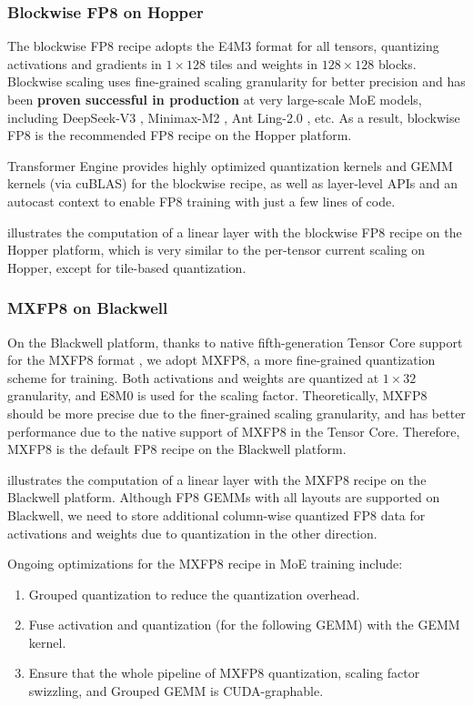 \subsubsection{Blockwise FP8 on Hopper}
The blockwise FP8 recipe adopts the E4M3 format for all tensors, quantizing activations and gradients in $1 \times 128$ tiles and weights in $128 \times 128$ blocks. Blockwise scaling uses fine-grained scaling granularity for better precision and has been \textbf{proven successful in production} at very large-scale MoE models, including DeepSeek-V3 \cite{deepseekai2025deepseekv3technicalreport}, Minimax-M2 \cite{minimax_m2}, Ant Ling-2.0 \cite{li2025every}, etc. As a result, blockwise FP8 is the recommended FP8 recipe on the Hopper platform.

Transformer Engine provides highly optimized quantization kernels and GEMM kernels (via cuBLAS) for the blockwise recipe, as well as layer-level APIs and an autocast context to enable FP8 training with just a few lines of code.

 illustrates the computation of a linear layer with the blockwise FP8 recipe on the Hopper platform, which is very similar to the per-tensor current scaling on Hopper, except for tile-based quantization.

\subsubsection{MXFP8 on Blackwell}
On the Blackwell platform, thanks to native fifth-generation Tensor Core support for the MXFP8 format \cite{rouhani2023microscalingdataformatsdeep}, we adopt MXFP8, a more fine-grained quantization scheme for training. Both activations and weights are quantized at $1 \times 32$ granularity, and E8M0 is used for the scaling factor. Theoretically, MXFP8 should be more precise due to the finer-grained scaling granularity, and has better performance due to the native support of MXFP8 in the Tensor Core. Therefore, MXFP8 is the default FP8 recipe on the Blackwell platform.

 illustrates the computation of a linear layer with the MXFP8 recipe on the Blackwell platform. Although FP8 GEMMs with all layouts are supported on Blackwell, we need to store additional column-wise quantized FP8 data for activations and weights due to quantization in the other direction.

Ongoing optimizations for the MXFP8 recipe in MoE training include:
\begin{enumerate}
    \item Grouped quantization to reduce the quantization overhead.
    \item Fuse activation and quantization (for the following GEMM) with the GEMM kernel.
    \item Ensure that the whole pipeline of MXFP8 quantization, scaling factor swizzling, and Grouped GEMM is CUDA-graphable.
\end{enumerate}

